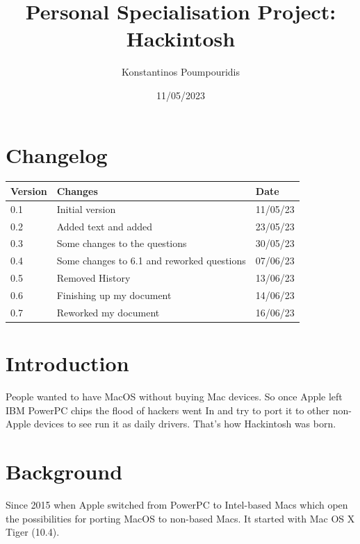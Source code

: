 \documentclass[12pt, letterpaper]{article}
\title{Personal Specialisation Project: Hackintosh}
\author{Konstantinos Poumpouridis}
\date{11/05/2023}
\newcommand{\titlepicture}[2][]{%
  \renewcommand\placetitlepicture{%
    \texttt{[image: \#2]}\par\medskip
  }%
}
\newcommand{\placetitlepicture}{} %
\begin{document}
\titlepicture[width=0.6\textwidth]{fotos/PSP/Hackintosh title.jpeg}
\maketitle
\thispagestyle{empty}
\newpage
\section{Changelog}
    \begin{table}[htbp]
        \begin{tabular}{|l|l|l|}
            \hline
            Version & Changes         & Date   \tabularnewline \hline
            0.1     & Initial version & 11/05/23 \tabularnewline \hline
            0.2     & Added text and added  & 23/05/23 \tabularnewline \hline
            0.3     & Some changes to the questions & 30/05/23 \tabularnewline \hline
            0.4     & Some changes to 6.1 and reworked questions & 07/06/23 \tabularnewline \hline
            0.5     & Removed History  & 13/06/23 \tabularnewline \hline
            0.6     & Finishing up my document  & 14/06/23 \tabularnewline \hline
            0.7     & Reworked my document  & 16/06/23 \tabularnewline \hline
        \end{tabular}
    \end{table}
\newpage
\tableofcontents
\newpage

\section{Introduction}
People wanted to have MacOS without buying Mac devices. So once Apple left IBM PowerPC chips the flood of hackers went In and try to port it to other non-Apple devices to see run it as daily drivers. That's how Hackintosh was born.

\section{Background}
Since 2015 when Apple switched from PowerPC to Intel-based Macs which open the possibilities for porting MacOS to non-based Macs. It started with Mac OS X Tiger (10.4).

 

\end{document}
